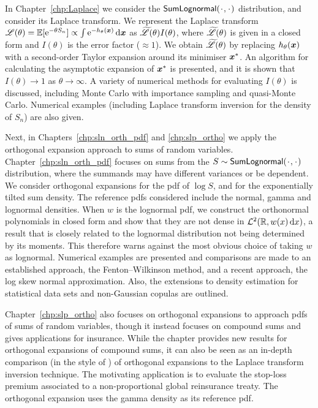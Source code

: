 In Chapter~\ref{chp:Laplace} we consider the $\SLNDist(\argdot,\argdot)$ distribution, and consider its Laplace transform. We represent the Laplace transform ${\mathscr{L}}(\theta)=\operatorname{{\mathbb E}}[\mathrm{e}^{-\theta S_n}]\propto \int \mathrm{e}^{ {-}h_\theta(\bm{x}) } \mathop{}\!\mathrm{d} \bm{x}$ as $\widetilde{\mathscr{L}}(\theta)I(\theta)$, where $\widetilde{\mathscr{L}}(\theta)$ is given in a closed form and $I(\theta)$ is the error factor ($\approx 1$). We obtain $\widetilde{\mathscr{L}}(\theta)$ by replacing $h_\theta(\bm{x})$ with a second-order Taylor expansion around its minimiser $\bm{x}^*$. An algorithm for calculating the asymptotic expansion of $\bm{x}^*$ is presented, and it is shown that $I(\theta)\to 1$ as $\theta\to\infty$. A variety of numerical methods for evaluating $I(\theta)$ is discussed, including Monte Carlo with importance sampling and quasi-Monte Carlo. Numerical examples (including Laplace transform inversion for the density of $S_n$) are also given.

Next, in Chapters~\ref{chp:sln_orth_pdf} and \ref{chp:slp_ortho} we apply the orthogonal expansion approach to sums of random variables. Chapter~\ref{chp:sln_orth_pdf} focuses on sums from the $S \sim \SLNDist(\argdot,\argdot)$ distribution, where the summands may have different
variances or be dependent. We consider orthogonal expansions for the pdf of $\log S$, and for the exponentially tilted sum density. The reference pdfs considered include the normal, gamma and lognormal densities. When $w$ is the lognormal pdf, we construct the orthonormal polynomials in closed form and show that they are not dense in $\mathcal{L}^2(\mathbb{R}, w(x) \mathop{}\!\mathrm{d} x)$, a result that is closely related to the lognormal distribution not being determined by its moments. This therefore warns against the most obvious choice of taking $w$ as lognormal. Numerical examples are presented and comparisons are made to an established approach, the Fenton--Wilkinson method, and a recent approach, the log skew normal approximation. Also, the extensions to density estimation for statistical data sets and non-Gaussian copulas are outlined.

Chapter~\ref{chp:slp_ortho} also focuses on orthogonal expansions to approach pdfs of sums of random variables, though it instead focuses on compound sums and gives applications for insurance. While the chapter provides new results for orthogonal expansions of compound sums, it can also be seen as an in-depth comparison (in the style of \cite{embrechts2009panjer}) of orthogonal expansions to the Laplace transform inversion technique. The motivating application is to evaluate the stop-loss premium associated to a non-proportional global reinsurance treaty. The orthogonal expansion uses the gamma density as its reference pdf.

